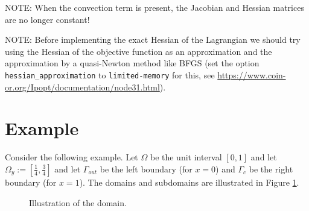\documentclass[
12pt, %
a4paper, %
onecolumn, %
portrait %
]{article}
\begin{document}
NOTE: When the convection term is present, the Jacobian and Hessian matrices are no longer constant!

NOTE: Before implementing the exact Hessian of the Lagrangian we should try using the Hessian of the objective function as an approximation and the approximation by a quasi-Newton method like BFGS (set the option \texttt{hessian\_approximation} to \texttt{limited-memory} for this, see \url{https://www.coin-or.org/Ipopt/documentation/node31.html}).

\section{Example}
Consider the following example. Let $\Omega$ be the unit interval $[0,1]$ and let $\Omega_y := [\frac{1}{4},\frac{3}{4}]$ and let $\Gamma_{out}$ be the left boundary (for $x=0$) and $\Gamma_c$ be the right boundary (for $x=1$). The domains and subdomains are illustrated in Figure \ref{fig:domain}.
\begin{figure}[h]
\begin{center}
\end{center}
\caption{Illustration of the domain.}
\label{fig:domain}
\end{figure}
\end{document}
